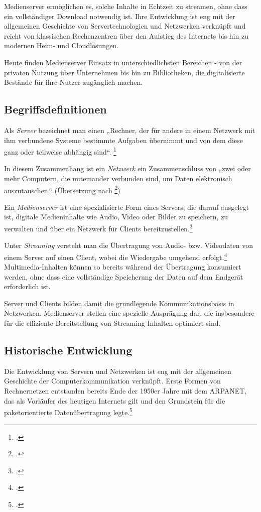 \documentclass[12pt,a4paper]{report}
\begin{document}
Medienserver ermöglichen es, solche Inhalte in Echtzeit zu streamen, 
ohne dass ein vollständiger Download notwendig ist. 
Ihre Entwicklung ist eng mit der allgemeinen Geschichte von Servertechnologien und Netzwerken verknüpft 
und reicht von klassischen Rechenzentren über den Aufstieg des Internets bis hin zu modernen Heim- und Cloudlösungen. 

Heute finden Medienserver Einsatz in unterschiedlichsten Bereichen - 
von der privaten Nutzung über Unternehmen bis hin zu Bibliotheken, 
die digitalisierte Bestände für ihre Nutzer zugänglich machen.

  \subsection{Begriffsdefinitionen}
  Als \emph{Server} bezeichnet man einen „Rechner, 
  der für andere in einem Netzwerk mit ihm verbundene Systeme bestimmte Aufgaben übernimmt 
  und von dem diese ganz oder teilweise abhängig sind“. \footcite{duden_server}

  In diesem Zusammenhang ist ein \emph{Netzwerk} ein Zusammenschluss von „zwei oder mehr Computern,
  die miteinander verbunden sind, um Daten elektronisch auszutauschen.“
  (Übersetzung nach \footcite{britannica_network})

  Ein \emph{Medienserver} ist eine spezialisierte Form eines Servers, 
  die darauf ausgelegt ist, digitale Medieninhalte wie Audio, Video oder Bilder zu speichern, 
  zu verwalten und über ein Netzwerk für Clients bereitzustellen.\footcite[Vgl.][S.~131 ~ff.]{steinmetz_multimedia}

  Unter \emph{Streaming} versteht man die Übertragung von Audio- bzw. Videodaten von einem Server auf einen Client, 
  wobei die Wiedergabe umgehend erfolgt.\footcite{gabler_streaming}
  Multimedia-Inhalten können so bereits während der Übertragung konsumiert werden, 
  ohne dass eine vollständige Speicherung der Daten auf dem Endgerät erforderlich ist.

  Server und Clients bilden damit die grundlegende Kommunikationsbasis in Netzwerken. 
  Medienserver stellen eine spezielle Ausprägung dar, 
  die insbesondere für die effiziente Bereitstellung von Streaming-Inhalten optimiert sind.

  \subsection{Historische Entwicklung}
  Die Entwicklung von Servern und Netzwerken ist eng mit der allgemeinen Geschichte der Computerkommunikation verknüpft. 
  Erste Formen von Rechnernetzen entstanden bereits Ende der 1950er Jahre mit dem ARPANET, 
  das als Vorläufer des heutigen Internets gilt 
  und den Grundstein für die paketorientierte Datenübertragung legte.\footcite[Vgl.][S.~45~f.]{tanenbaum_computernetworks}
\end{document}
